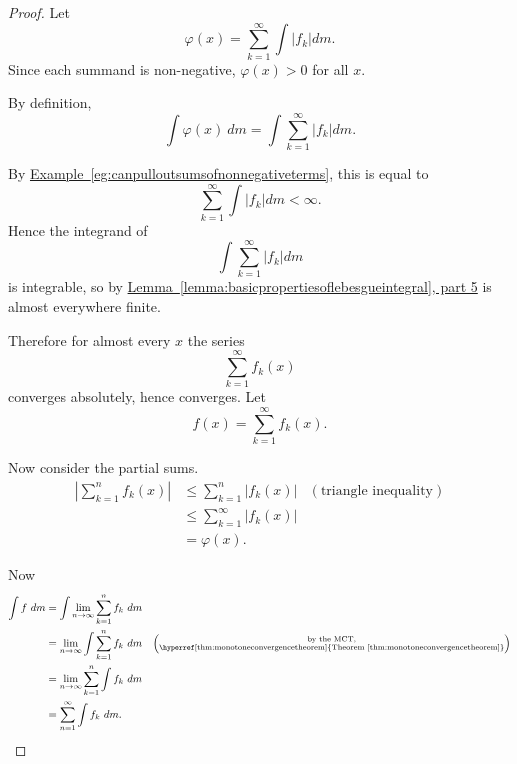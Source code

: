 \documentclass[a4paper]{scrartcl}
\theoremstyle{definition}
\theoremstyle{plain}
\theoremstyle{remark}
\begin{document}
\begin{proof}
  Let
  \begin{equation*}
    \varphi(x) = \sum_{k=1}^{\infty} \int \left|f_{k}\right| dm.
  \end{equation*}
  Since each summand is non-negative, $\varphi(x) > 0$ for all $x$.

  By definition,
  \begin{equation*}
    \int \varphi(x)\ dm = \int\sum_{k=1}^{\infty}\left|f_{k}\right|dm.
  \end{equation*}

  By \hyperref[eg:canpulloutsumsofnonnegativeterms]{Example~\ref*{eg:canpulloutsumsofnonnegativeterms}}, this is equal to
  \begin{equation*}
    \sum_{k=1}^{\infty}\int\left|f_{k}\right|dm < \infty.
  \end{equation*}
  Hence the integrand of
  \begin{equation*}
    \int\sum_{k=1}^{\infty}\left|f_{k}\right|dm
  \end{equation*}
  is integrable, so by \hyperref[lemma:basicpropertiesoflebesgueintegral]{Lemma~\ref*{lemma:basicpropertiesoflebesgueintegral}, part 5} is almost everywhere finite.

  Therefore for almost every $x$ the series
  \begin{equation*}
    \sum_{k=1}^{\infty} f_{k}(x)
  \end{equation*}
  converges absolutely, hence converges. Let
  \begin{equation*}
    f(x) = \sum_{k=1}^{\infty} f_{k}(x).
  \end{equation*}

  Now consider the partial sums.
  \begin{align*}
    \left|\sum_{k=1}^{n} f_{k}(x) \right| &\leq \sum_{k=1}^{n} \left|f_{k}(x) \right| & (\text{triangle inequality}) \\
    &\leq \sum_{k=1}^{\infty} \left| f_{k}(x) \right| \\
    &= \varphi(x).
  \end{align*}

  Now
  \begin{align*}
    \int f\ dm &= \int \lim_{n \to \infty} \sum_{k=1}^{n} f_{k}\ dm \\
    &= \lim_{n \to \infty} \int \sum_{k=1}^{n} f_{k}\ dm &\left( \substack{\text{by the MCT,}\\ \text{\hyperref[thm:monotoneconvergencetheorem]{Theorem~\ref*{thm:monotoneconvergencetheorem}}}} \right) \\
    &= \lim_{n \to \infty} \sum_{k = 1}^{n} \int f_{k}\ dm \\
    &= \sum_{n=1}^{\infty} \int f_{k}\ dm.
  \end{align*}
\end{proof}
\end{document}
